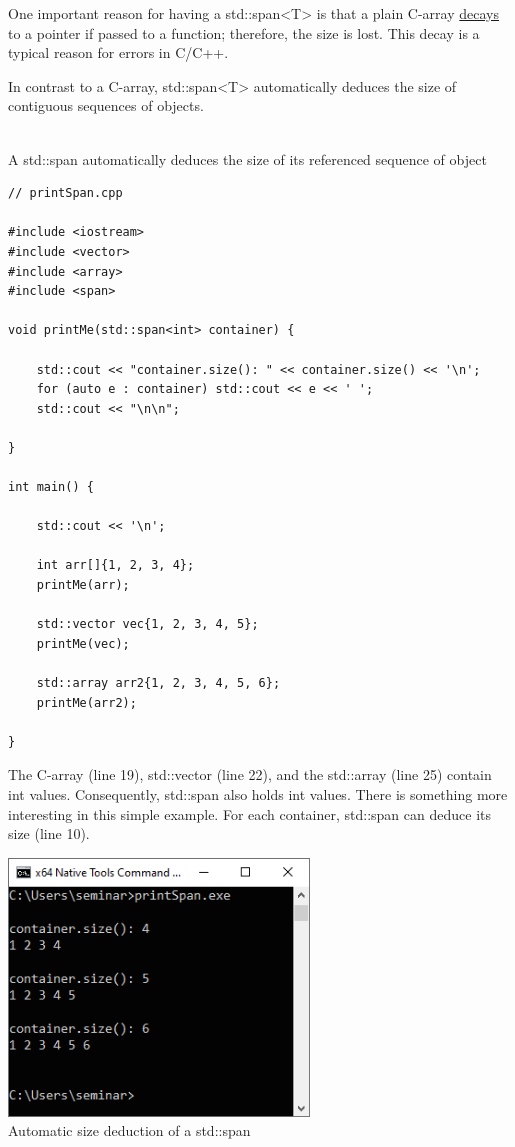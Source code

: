 One important reason for having a std::span<T> is that a plain C-array \href{https://en.cppreference.com/w/cpp/types/decay}{decays} to a pointer if passed to a function; therefore, the size is lost. This decay is a typical reason for errors in C/C++.


In contrast to a C-array, std::span<T> automatically deduces the size of contiguous sequences of objects.

\hspace*{\fill} \\ %
\noindent
A std::span automatically deduces the size of its referenced sequence of object
\begin{lstlisting}[style=styleCXX]
// printSpan.cpp

#include <iostream>
#include <vector>
#include <array>
#include <span>

void printMe(std::span<int> container) {

	std::cout << "container.size(): " << container.size() << '\n';
	for (auto e : container) std::cout << e << ' ';
	std::cout << "\n\n";
	
}

int main() {

	std::cout << '\n';
	
	int arr[]{1, 2, 3, 4};
	printMe(arr);
	
	std::vector vec{1, 2, 3, 4, 5};
	printMe(vec);
	
	std::array arr2{1, 2, 3, 4, 5, 6};
	printMe(arr2);

}
\end{lstlisting}

The C-array (line 19), std::vector (line 22), and the std::array (line 25) contain int values. Consequently, std::span also holds int values. There is something more interesting in this simple example. For each container, std::span can deduce its size (line 10).

\begin{center}
\includegraphics[width=0.6\textwidth]{content/3/chapter5/images/5.png}\\
Automatic size deduction of a std::span
\end{center}

